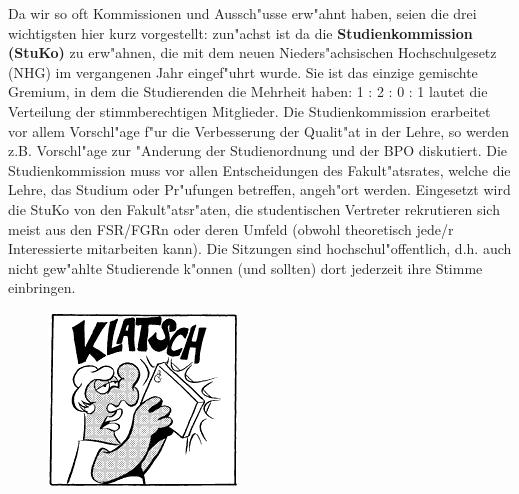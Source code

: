 Da wir so oft Kommissionen und Aussch"usse erw"ahnt haben, seien die drei 
wichtigsten hier kurz vorgestellt: zun"achst ist da die 
\textbf{Studienkommission (StuKo)} zu erw"ahnen, die mit dem neuen 
Nieders"achsischen Hochschulgesetz (NHG) im vergangenen Jahr eingef"uhrt wurde. 
Sie ist das einzige gemischte Gremium, in dem die Studierenden die Mehrheit 
haben: 1 : 2 : 0 : 1 lautet die Verteilung der stimmberechtigen Mitglieder. Die 
Studienkommission erarbeitet vor allem Vorschl"age f"ur die Verbesserung der 
Qualit"at in der Lehre, so werden z.B. Vorschl"age zur "Anderung der 
Studienordnung und der BPO diskutiert. Die Studienkommission muss vor allen 
Entscheidungen des Fakult"atsrates, welche die Lehre, das Studium oder 
Pr"ufungen betreffen, angeh"ort werden. Eingesetzt wird die StuKo von den 
Fakult"atsr"aten, die studentischen Vertreter rekrutieren sich meist aus den 
FSR/FGRn oder deren Umfeld (obwohl theoretisch jede/r Interessierte mitarbeiten 
kann). Die Sitzungen sind hochschul"offentlich, d.h. auch nicht gew"ahlte 
Studierende k"onnen (und sollten) dort jederzeit ihre Stimme einbringen.

\begin{figure}[h]
  \centering\includegraphics[width = 0.7\linewidth]{bilder/comics/otto1_3.png}
\end{figure}

